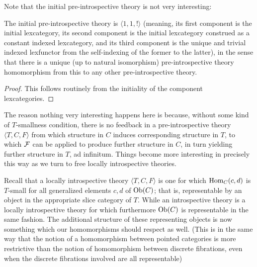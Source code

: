 Note that the initial pre-introspective theory is not very interesting:

\begin{theorem}
The initial pre-introspective theory is $\langle 1, 1, !\rangle$ (meaning, its first component is the initial lexcategory, its second component is the initial lexcategory construed as a constant indexed lexcategory, and its third component is the unique and trivial indexed lexfunctor from the self-indexing of the former to the latter), in the sense that there is a unique (up to natural isomorphism) pre-introspective theory homomorphism from this to any other pre-introspective theory.
\end{theorem}
\begin{proof}
This follows routinely from the initiality of the component lexcategories.
\end{proof}

The reason nothing very interesting happens here is because, without some kind of $T$-smallness condition, there is no feedback in a pre-introspective theory $\langle T, C, F \rangle$ from which structure in $C$ induces corresponding structure in $T$, to which $\mathcal{F}$ can be applied to produce further structure in $C$, in turn yielding further structure in $T$, ad infinitum. Things become more interesting in precisely this way as we turn to free locally introspective theories.

Recall that a locally introspective theory $\langle T, C, F \rangle$ is one for which $\operatorname{Hom}_C(c, d)$ is $T$-small for all generalized elements $c, d$ of $\operatorname{Ob}(C)$; that is, representable by an object in the appropriate slice category of $T$. While an introspective theory is a locally introspective theory for which furthermore $\operatorname{Ob}(C)$ is representable in the same fashion. The additional structure of these representing objects is now something which our homomorphisms should respect as well. (This is in the same way that the notion of a homomorphism between pointed categories is more restrictive than the notion of homomorphism between discrete fibrations, even when the discrete fibrations involved are all representable)

